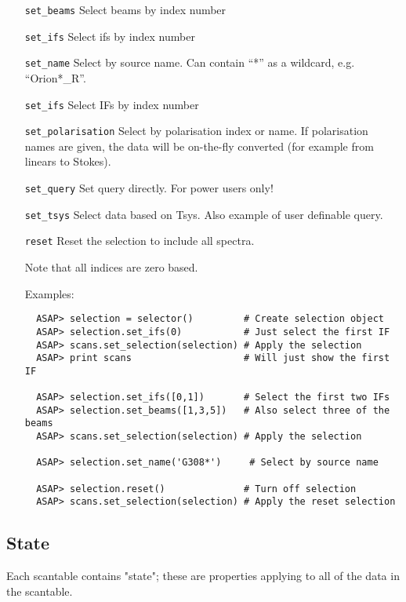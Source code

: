 \documentclass[11pt]{article}
\newcommand{\cmd}[1]{{\tt #1}}
\begin{document}
\begin{itemize}

\item[\cmd{set\_beams}] Select beams by index number
\item[\cmd{set\_ifs}] Select ifs by index number
\item[\cmd{set\_name}] Select by source name. Can contain ``*'' as a
wildcard, e.g. ``Orion*\_R''.
\item[\cmd{set\_ifs}] Select IFs by index number
\item[\cmd{set\_polarisation}] Select by polarisation index or
name. If polarisation names are given, the data will be on-the-fly
converted (for example from linears to Stokes).
\item[\cmd{set\_query}] Set query directly. For power users only!
\item[\cmd{set\_tsys}] Select data based on Tsys. Also example of user
definable query.
\item[\cmd{reset}] Reset the selection to include all spectra.


Note that all indices are zero based.

Examples:

\begin{verbatim}
  ASAP> selection = selector()         # Create selection object
  ASAP> selection.set_ifs(0)           # Just select the first IF
  ASAP> scans.set_selection(selection) # Apply the selection
  ASAP> print scans                    # Will just show the first IF

  ASAP> selection.set_ifs([0,1])       # Select the first two IFs
  ASAP> selection.set_beams([1,3,5])   # Also select three of the beams
  ASAP> scans.set_selection(selection) # Apply the selection

  ASAP> selection.set_name('G308*')     # Select by source name

  ASAP> selection.reset()              # Turn off selection
  ASAP> scans.set_selection(selection) # Apply the reset selection

\end{verbatim}

\end{itemize}

\subsection{State}

Each scantable contains "state"; these are
properties applying to all of the data in the scantable.
\end{document}
